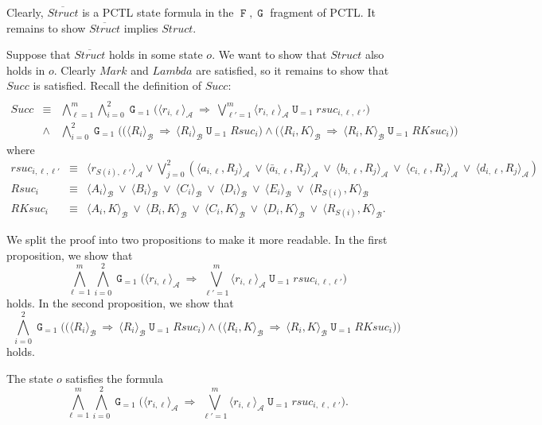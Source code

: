\documentclass[a4paper,UKenglish,cleveref, autoref, thm-restate]{lipics-v2021}
\newcommand{\A}{\mathcal{A}}
\newcommand{\B}{\mathcal{B}}
\newcommand{\ex}[1]{\langle #1 \rangle}
\newcommand{\Succ}{\mathit{Succ}}
\newcommand{\Struct}{\textit{Struct}}
\newcommand{\rSuc}{\textit{rsuc}}
\newcommand{\RSuc}{\textit{Rsuc}}
\newcommand{\RKSuc}{\textit{RKsuc}}
\newcommand*{\opu}{\operatorname{\pmb{\mathtt{U}}}}
\newcommand*{\opf}{\operatorname{\pmb{\mathtt{F}}}}
\newcommand*{\opg}{\operatorname{\pmb{\mathtt{G}}}}
\begin{document}
Clearly, $\overline{\Struct}$ is a PCTL state formula 
in the $\opf,\opg$ fragment of PCTL. It remains to show
$\overline{\Struct}$ implies $\Struct$.

Suppose that $\overline{\Struct}$ holds in some state $o$.
We want to show that $\Struct$ also holds in $o$.
Clearly $Mark$ and $Lambda$ are satisfied,
so it remains to show that $\Succ$ is satisfied.
Recall the definition of $\Succ$:
\begin{eqnarray*}\\[-2em]
    \Succ & \equiv & \bigwedge_{\ell=1}^m \bigwedge_{i=0}^2 \opg_{=1} \bigg(  \ex{r_{i,\ell}}_{\A} \ \Rightarrow \ \bigvee_{\ell'=1}^m \ex{r_{i,\ell}}_{\A} \opu_{=1} \rSuc_{i,\ell,\ell'} \bigg)\\ 
       & \wedge & \bigwedge_{i=0}^2 \opg_{=1} \bigg(
       \big( \ex{R_i}_{\B} \ \Rightarrow \ \ex{R_i}_{\B} \opu_{=1} \RSuc_i \big) 
       \wedge
       \big( \ex{R_i,K}_{\B} \ \Rightarrow \ \ex{R_i,K}_{\B} \opu_{=1} \RKSuc_i \big) 
       \bigg)
\end{eqnarray*}
where\\[-2.5em]
\begin{eqnarray*}
    \rSuc_{i,\ell,\ell'} & \equiv & \ex{r_{S(i),\ell'}}_{\A} \vee \bigvee_{j=0}^2 \left(\ex{a_{i,\ell},R_j}_{\A} \ \vee \ex{\bar{a}_{i,\ell},R_j}_{\A}\ \vee \ \ex{b_{i,\ell}, R_j}_{\A} \ \vee \ \ex{c_{i,\ell},R_j}_{\A} \ \vee \ \ex{d_{i,\ell},R_j}_{\A}\right)  \\
    \RSuc_i & \equiv & \ex{A_i}_{\B} \ \vee \ \ex{B_i}_{\B} \ \vee \ \ex{C_i}_{\B} \ \vee \ \ex{D_i}_{\B} \ \vee \ \ex{E_i}_{\B} \ \vee \ \ex{R_{S(i)},K}_{\B}\\
    \RKSuc_i & \equiv & \ex{A_i,K}_{\B} \ \vee \ \ex{B_i,K}_{\B} \ \vee \ \ex{C_i,K}_{\B} \ \vee \ \ex{D_i,K}_{\B}  \ \vee \ \ex{R_{S(i)},K}_{\B}.
\end{eqnarray*} 

We split the proof into two propositions to make it more readable.
In the first proposition, we show that
\[
\bigwedge_{\ell=1}^m \bigwedge_{i=0}^2 \opg_{=1} \bigg(  \ex{r_{i,\ell}}_{\A} \ \Rightarrow \ \bigvee_{\ell'=1}^m \ex{r_{i,\ell}}_{\A} \opu_{=1} \rSuc_{i,\ell,\ell'} \bigg)
\]
holds.
In the second proposition, we show that
\[
       \bigwedge_{i=0}^2 \opg_{=1} \bigg(
       \big( \ex{R_i}_{\B} \ \Rightarrow \ \ex{R_i}_{\B} \opu_{=1} \RSuc_i \big) 
       \wedge
       \big( \ex{R_i,K}_{\B} \ \Rightarrow \ \ex{R_i,K}_{\B} \opu_{=1} \RKSuc_i \big) 
       \bigg)
\]
holds.

\begin{proposition}
The state $o$ satisfies the formula
\[
\bigwedge_{\ell=1}^m \bigwedge_{i=0}^2 \opg_{=1} \bigg(  \ex{r_{i,\ell}}_{\A} \ \Rightarrow \ \bigvee_{\ell'=1}^m \ex{r_{i,\ell}}_{\A} \opu_{=1} \rSuc_{i,\ell,\ell'} \bigg).
\]
\end{proposition}
\end{document}
